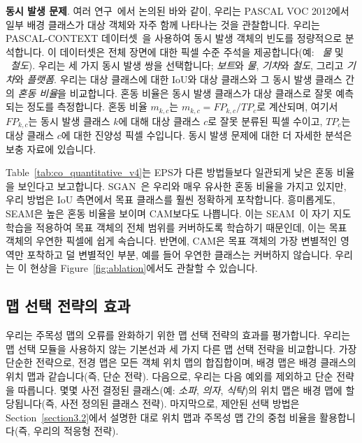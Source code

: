 \documentclass[final]{cvpr}
\begin{document}
\vspace{1mm}
\noindent \textbf{동시 발생 문제}. 여러 연구~\cite{huang2018weakly, kolesnikov2016seed, li2018tell, oh2017exploiting}에서 논의된 바와 같이, 우리는 PASCAL VOC 2012에서 일부 배경 클래스가 대상 객체와 자주 함께 나타나는 것을 관찰합니다. 우리는 PASCAL-CONTEXT 데이터셋~\cite{mottaghi2014role}을 사용하여 동시 발생 객체의 빈도를 정량적으로 분석합니다. 이 데이터셋은 전체 장면에 대한 픽셀 수준 주석을 제공합니다(예: ~\emph{물} 및 ~\emph{철도}). 우리는 세 가지 동시 발생 쌍을 선택합니다; \emph{보트}와 \emph{물}, \emph{기차}와 \emph{철도}, 그리고 \emph{기차}와 \emph{플랫폼}. 우리는 대상 클래스에 대한 IoU와 대상 클래스와 그 동시 발생 클래스 간의 \emph{혼동 비율}을 비교합니다. 혼동 비율은 동시 발생 클래스가 대상 클래스로 잘못 예측되는 정도를 측정합니다. 혼동 비율 $m_{k,c}$는 $m_{k,c} = FP_{k,c}/TP_{c}$로 계산되며, 여기서 ${FP_{k,c}}$는 동시 발생 클래스 $k$에 대해 대상 클래스 $c$로 잘못 분류된 픽셀 수이고, $TP_{c}$는 대상 클래스 $c$에 대한 진양성 픽셀 수입니다. 동시 발생 문제에 대한 더 자세한 분석은 보충 자료에 있습니다.


Table~\ref{tab:co_quantitative_v4}는 EPS가 다른 방법들보다 일관되게 낮은 혼동 비율을 보인다고 보고합니다. SGAN~\cite{yao2020saliency}은 우리와 매우 유사한 혼동 비율을 가지고 있지만, 우리 방법은 IoU 측면에서 목표 클래스를 훨씬 정확하게 포착합니다. 흥미롭게도, SEAM은 높은 혼동 비율을 보이며 CAM보다도 나쁩니다. 이는 SEAM~\cite{wang2020self}이 자기 지도 학습을 적용하여 목표 객체의 전체 범위를 커버하도록 학습하기 때문인데, 이는 목표 객체의 우연한 픽셀에 쉽게 속습니다. 반면에, CAM은 목표 객체의 가장 변별적인 영역만 포착하고 덜 변별적인 부분, 예를 들어 우연한 클래스는 커버하지 않습니다. 우리는 이 현상을 Figure~\ref{fig:ablation}에서도 관찰할 수 있습니다.




\subsection{맵 선택 전략의 효과}
우리는 주목성 맵의 오류를 완화하기 위한 맵 선택 전략의 효과를 평가합니다. 우리는 맵 선택 모듈을 사용하지 않는 기본선과 세 가지 다른 맵 선택 전략을 비교합니다. 가장 단순한 전략으로, 전경 맵은 모든 객체 위치 맵의 합집합이며, 배경 맵은 배경 클래스의 위치 맵과 같습니다(즉, 단순 전략). 다음으로, 우리는 다음 예외를 제외하고 단순 전략을 따릅니다. 몇몇 사전 결정된 클래스(예: \emph{소파}, \emph{의자}, \emph{식탁})의 위치 맵은 배경 맵에 할당됩니다(즉, 사전 정의된 클래스 전략). 마지막으로, 제안된 선택 방법은 Section~\ref{section3.2}에서 설명한 대로 위치 맵과 주목성 맵 간의 중첩 비율을 활용합니다(즉, 우리의 적응형 전략).
\end{document}
